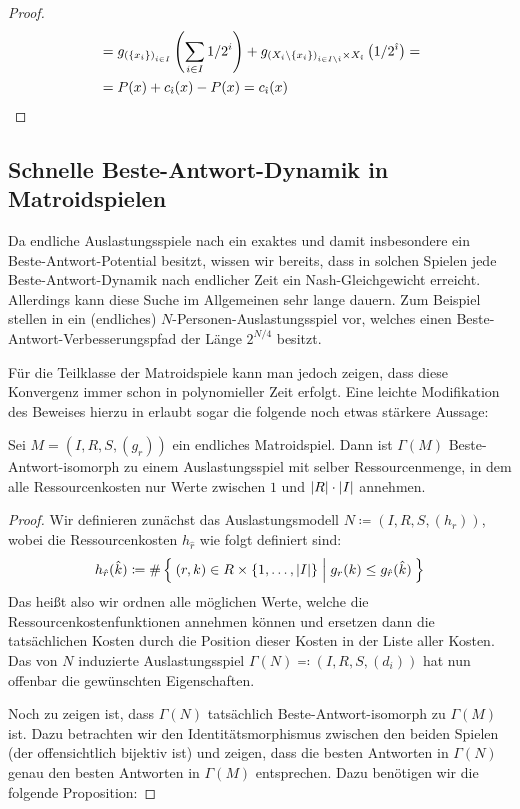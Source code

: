 \begin{proof}
\begin{align*}
	&=g_{\left(\{x_i\}\right)_{i \in I}}\left(\sum_{i \in I} 1/2^i\right) + g_{\left(X_i\setminus\{x_i\}\right)_{i \in I\setminus\hat{\imath}} \times X_{\hat{\imath}}}\left(1/2^{\hat{\imath}}\right) = \\
	&=P(x) + c_{\hat{\imath}}(x) - P(x) = c_{\hat{\imath}}(x) \qedhere									
	\end{align*}
\end{proof}

\subsection{Schnelle Beste-Antwort-Dynamik in Matroidspielen}\label{sec:Auslastungsspiele:BADynamiken}

Da endliche Auslastungsspiele nach  ein exaktes und damit insbesondere ein Beste-Antwort-Potential besitzt, wissen wir bereits, dass in solchen Spielen jede Beste-Antwort-Dynamik nach endlicher Zeit ein Nash-Gleichgewicht erreicht. Allerdings kann diese Suche im Allgemeinen sehr lange dauern. Zum Beispiel stellen \citeauthor{BAPfadLaengeInAusl} in \cite[Theorem 3.1]{BAPfadLaengeInAusl} ein (endliches) $N$-Personen-Auslastungsspiel vor, welches einen Beste-Antwort-Verbesserungspfad der Länge $2^{N/4}$ besitzt.

Für die Teilklasse der Matroidspiele kann man jedoch zeigen, dass diese Konvergenz immer schon in polynomieller Zeit erfolgt. Eine leichte Modifikation des Beweises hierzu in \cite[Theorem 2.5]{BAPfadLaengeInAusl} erlaubt sogar die folgende noch etwas stärkere Aussage:

\begin{satz}\label{satz:BAPotentialFuerMatroidspiele}
	Sei $M = (I, R, S, (g_r))$ ein endliches Matroidspiel. Dann ist $\Gamma(M)$ Beste-Antwort-isomorph zu einem Auslastungsspiel mit selber Ressourcenmenge, in dem alle Ressourcenkosten nur Werte zwischen $1$ und $\left|R\right|\cdot\left|I\right|$ annehmen.
\end{satz}

\begin{proof}
	Wir definieren zunächst das Auslastungsmodell $N \coloneqq (I, R, S, (h_r))$, wobei die Ressourcenkosten $h_{\hat{r}}$ wie folgt definiert sind:
		\[h_{\hat{r}}(\hat{k}) \coloneqq \#\Set{(r, k) \in R\times \{1, \dots, \left|I\right|\} | g_r(k) \leq g_{\hat{r}}(\hat{k})} \]
	Das heißt also wir ordnen alle möglichen Werte, welche die Ressourcenkostenfunktionen annehmen können und ersetzen dann die tatsächlichen Kosten durch die Position dieser Kosten in der Liste aller Kosten. Das von $N$ induzierte Auslastungsspiel $\Gamma(N) \eqqcolon (I, R, S, (d_i))$ hat nun offenbar die gewünschten Eigenschaften. 
	
	Noch zu zeigen ist, dass $\Gamma(N)$ tatsächlich Beste-Antwort-isomorph zu $\Gamma(M)$ ist. Dazu betrachten wir den Identitätsmorphismus zwischen den beiden Spielen (der offensichtlich bijektiv ist) und zeigen, dass die besten Antworten in $\Gamma(N)$ genau den besten Antworten in $\Gamma(M)$ entsprechen. Dazu benötigen wir die folgende Proposition:	\noqed
\end{proof}
	
